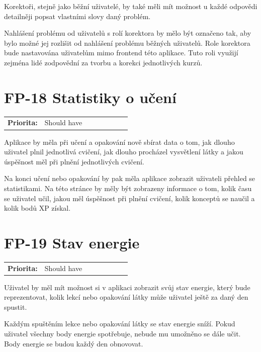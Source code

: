 Korektoři, stejně jako běžní uživatelé, by také měli mít možnost u každé odpovědi detailněji popsat vlastními slovy daný problém. 

Nahlášení problému od uživatelů s rolí korektora by mělo být označeno tak, aby bylo možné jej rozlišit od nahlášení problému běžných uživatelů. Role korektora bude nastavována uživatelům mimo frontend této aplikace. Tuto roli využijí zejména lidé zodpovědní za tvorbu a korekci jednotlivých kurzů.

\section{FP-18 Statistiky o učení}\label{sec:fp-learning-stats}

\begin{tabular}{lp{0.7\linewidth}}
    \textbf{Priorita:} & Should have \\
\end{tabular}

Aplikace by měla při učení a opakování nově sbírat data o tom, jak dlouho uživatel plnil jednotlivá cvičení, jak dlouho procházel vysvětlení látky a jakou úspěšnost měl při plnění jednotlivých cvičení.

Na konci učení nebo opakování by pak měla aplikace zobrazit uživateli přehled se statistikami. Na této stránce by měly být zobrazeny informace o tom, kolik času se uživatel učil, jakou měl úspěšnost při plnění cvičení, kolik konceptů se naučil a kolik bodů XP získal.

\section{FP-19 Stav energie}\label{sec:fp-energy-status}

\begin{tabular}{lp{0.7\linewidth}}
    \textbf{Priorita:} & Should have \\
\end{tabular}

Uživatel by měl mít možnost si v aplikaci zobrazit svůj stav energie, který bude reprezentovat, kolik lekcí nebo opakování látky může uživatel ještě za daný den spustit.

Každým spuštěním lekce nebo opakování látky se stav energie sníží. Pokud uživatel všechny body energie spotřebuje, nebude mu umožněno se dále učit. Body energie se budou každý den obnovovat.

